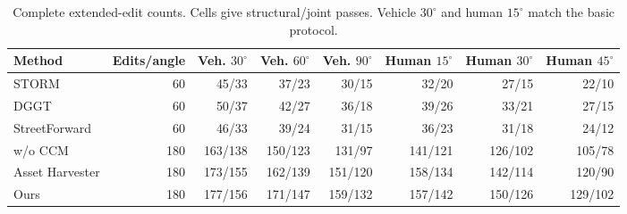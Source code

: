 \begin{table}[H]
\centering\small
\setlength{\tabcolsep}{3pt}
\caption{Complete extended-edit counts. Cells give structural/joint passes. Vehicle $30^\circ$ and human $15^\circ$ match the basic protocol.}
\label{tab:extended-edit-counts}
\begin{tabular}{@{}lrrrrrrr@{}}
\toprule
Method & Edits/angle & Veh. $30^\circ$ & Veh. $60^\circ$ & Veh. $90^\circ$ & Human $15^\circ$ & Human $30^\circ$ & Human $45^\circ$ \\
\midrule
STORM & 60 & 45/33 & 37/23 & 30/15 & 32/20 & 27/15 & 22/10 \\
DGGT & 60 & 50/37 & 42/27 & 36/18 & 39/26 & 33/21 & 27/15 \\
StreetForward & 60 & 46/33 & 39/24 & 31/15 & 36/23 & 31/18 & 24/12 \\
w/o CCM & 180 & 163/138 & 150/123 & 131/97 & 141/121 & 126/102 & 105/78 \\
Asset Harvester & 180 & 173/155 & 162/139 & 151/120 & 158/134 & 142/114 & 120/90 \\
Ours & 180 & 177/156 & 171/147 & 159/132 & 157/142 & 150/126 & 129/102 \\
\bottomrule
\end{tabular}
\end{table}

